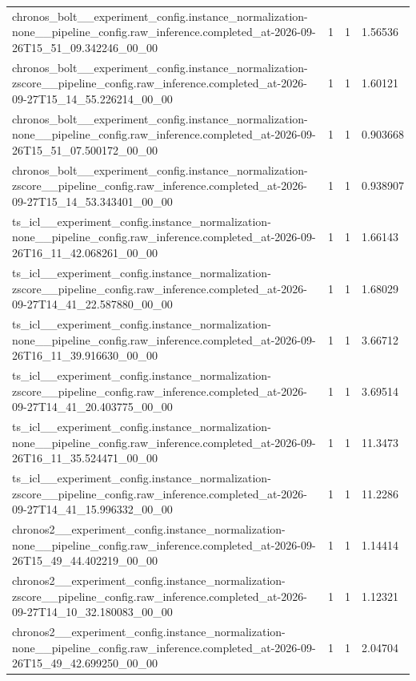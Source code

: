 \begin{tabular}{llll}
chronos\_bolt\_\_experiment\_config.instance\_normalization-none\_\_pipeline\_config.raw\_inference.completed\_at-2026-09-26T15\_51\_09.342246\_00\_00 & 1 & 1 & 1.56536 \\
chronos\_bolt\_\_experiment\_config.instance\_normalization-zscore\_\_pipeline\_config.raw\_inference.completed\_at-2026-09-27T15\_14\_55.226214\_00\_00 & 1 & 1 & 1.60121 \\
chronos\_bolt\_\_experiment\_config.instance\_normalization-none\_\_pipeline\_config.raw\_inference.completed\_at-2026-09-26T15\_51\_07.500172\_00\_00 & 1 & 1 & 0.903668 \\
chronos\_bolt\_\_experiment\_config.instance\_normalization-zscore\_\_pipeline\_config.raw\_inference.completed\_at-2026-09-27T15\_14\_53.343401\_00\_00 & 1 & 1 & 0.938907 \\
ts\_icl\_\_experiment\_config.instance\_normalization-none\_\_pipeline\_config.raw\_inference.completed\_at-2026-09-26T16\_11\_42.068261\_00\_00 & 1 & 1 & 1.66143 \\
ts\_icl\_\_experiment\_config.instance\_normalization-zscore\_\_pipeline\_config.raw\_inference.completed\_at-2026-09-27T14\_41\_22.587880\_00\_00 & 1 & 1 & 1.68029 \\
ts\_icl\_\_experiment\_config.instance\_normalization-none\_\_pipeline\_config.raw\_inference.completed\_at-2026-09-26T16\_11\_39.916630\_00\_00 & 1 & 1 & 3.66712 \\
ts\_icl\_\_experiment\_config.instance\_normalization-zscore\_\_pipeline\_config.raw\_inference.completed\_at-2026-09-27T14\_41\_20.403775\_00\_00 & 1 & 1 & 3.69514 \\
ts\_icl\_\_experiment\_config.instance\_normalization-none\_\_pipeline\_config.raw\_inference.completed\_at-2026-09-26T16\_11\_35.524471\_00\_00 & 1 & 1 & 11.3473 \\
ts\_icl\_\_experiment\_config.instance\_normalization-zscore\_\_pipeline\_config.raw\_inference.completed\_at-2026-09-27T14\_41\_15.996332\_00\_00 & 1 & 1 & 11.2286 \\
chronos2\_\_experiment\_config.instance\_normalization-none\_\_pipeline\_config.raw\_inference.completed\_at-2026-09-26T15\_49\_44.402219\_00\_00 & 1 & 1 & 1.14414 \\
chronos2\_\_experiment\_config.instance\_normalization-zscore\_\_pipeline\_config.raw\_inference.completed\_at-2026-09-27T14\_10\_32.180083\_00\_00 & 1 & 1 & 1.12321 \\
chronos2\_\_experiment\_config.instance\_normalization-none\_\_pipeline\_config.raw\_inference.completed\_at-2026-09-26T15\_49\_42.699250\_00\_00 & 1 & 1 & 2.04704 \\

\end{tabular}
